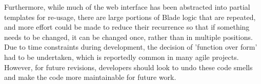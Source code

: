 Furthermore, while much of the web interface has been abstracted into partial templates for re-usage, there are large portions of Blade logic that are repeated, and more effort could be made to reduce their recurrence so that if something needs to be changed, it can be changed once, rather than in multiple positions. Due to time constraints during development, the decision of 'function over form' had to be undertaken, which is reportedly common in many agile projects. However, for future revisions, developers should look to undo these code smells and make the code more maintainable for future work.